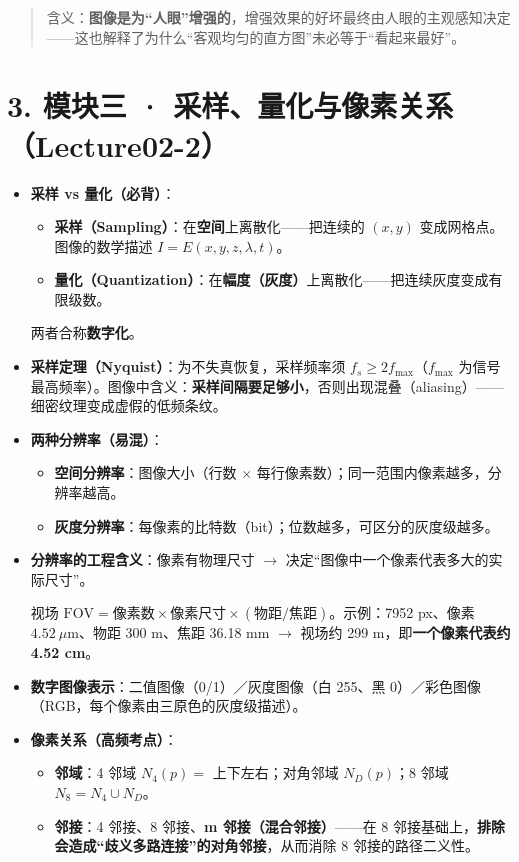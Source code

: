 \begin{quote}含义：\textbf{图像是为“人眼”增强的}，增强效果的好坏最终由人眼的主观感知决定——这也解释了为什么“客观均匀的直方图”未必等于“看起来最好”。\end{quote}
\section*{3. 模块三 · 采样、量化与像素关系（Lecture02-2）}
\begin{itemize}
\item \textbf{采样 vs 量化（必背）}：
\begin{itemize}
\item \textbf{采样（Sampling）}：在\textbf{空间}上离散化——把连续的 $(x,y)$ 变成网格点。图像的数学描述 $I=E(x,y,z,\lambda,t)$。
\item \textbf{量化（Quantization）}：在\textbf{幅度（灰度）}上离散化——把连续灰度变成有限级数。
\end{itemize}
两者合称\textbf{数字化}。
\item \textbf{采样定理（Nyquist）}：为不失真恢复，采样频率须 $f_s\geq 2f_{\max}$（$f_{\max}$ 为信号最高频率）。图像中含义：\textbf{采样间隔要足够小}，否则出现混叠（aliasing）——细密纹理变成虚假的低频条纹。
\item \textbf{两种分辨率（易混）}：
\begin{itemize}
\item \textbf{空间分辨率}：图像大小（行数 $\times$ 每行像素数）；同一范围内像素越多，分辨率越高。
\item \textbf{灰度分辨率}：每像素的比特数（bit）；位数越多，可区分的灰度级越多。
\end{itemize}
\item \textbf{分辨率的工程含义}：像素有物理尺寸 $\to$ 决定“图像中一个像素代表多大的实际尺寸”。\par
视场 $\mathrm{FOV}=\text{像素数}\times\text{像素尺寸}\times(\text{物距}/\text{焦距})$。示例：7952 px、像素 $4.52\ \mu\mathrm{m}$、物距 300 m、焦距 36.18 mm $\to$ 视场约 299 m，即\textbf{一个像素代表约 4.52 cm}。
\item \textbf{数字图像表示}：二值图像（0/1）／灰度图像（白 255、黑 0）／彩色图像（RGB，每个像素由三原色的灰度级描述）。
\item \textbf{像素关系（高频考点）}：
\begin{itemize}
\item \textbf{邻域}：4 邻域 $N_4(p)=$ 上下左右；对角邻域 $N_D(p)$；8 邻域 $N_8=N_4\cup N_D$。
\item \textbf{邻接}：4 邻接、8 邻接、\textbf{m 邻接（混合邻接）}——在 8 邻接基础上，\textbf{排除会造成“歧义多路连接”的对角邻接}，从而消除 8 邻接的路径二义性。

\end{itemize}
\end{itemize}
